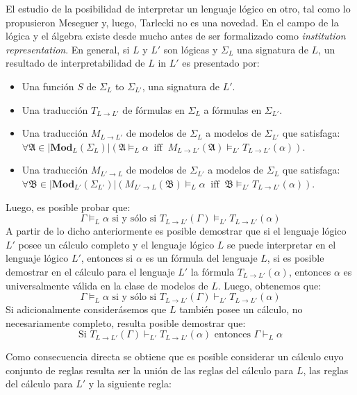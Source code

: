 El estudio de la posibilidad de interpretar un lenguaje lógico en otro, tal como lo propusieron Meseguer y, luego, Tarlecki no es una novedad. En el campo de la lógica y el álgebra existe desde mucho antes de ser formalizado como \emph{institution representation}. En general, si $L$ y $L'$ son lógicas y $\Sigma_L$ una signatura de $L$, un
resultado de interpretabilidad de $L$ in $L'$ es presentado por:
\begin{itemize}
\item Una función $S$ de $\Sigma_L$ to $\Sigma_{L'}$, una signatura de $L'$.
\item Una traducción $T_{L \to L'}$  de fórmulas en $\Sigma_L$ a fórmulas en $\Sigma_{L'}$.
\item Una traducción $M_{L \to L'}$ de modelos de $\Sigma_L$ a modelos de $\Sigma_{L'}$ que satisfaga: $\forall \mathfrak{A} \in |\mathbf{Mod}_L(\Sigma_L)| \left( \mathfrak{A}\models_{L} \alpha\ \mbox{ iff }\ M_{L \to L'}(\mathfrak{A}) \models_{L'} T_{L \to L'}(\alpha) \right)$.
\item Una traducción $M_{L' \to L}$ de modelos de $\Sigma_{L'}$ a modelos de $\Sigma_L$ que satisfaga: $\forall \mathfrak{B} \in |\mathbf{Mod}_{L'}(\Sigma_{L'})| \left(M_{L' \to L}(\mathfrak{B})\models_{L} \alpha\ \mbox{ iff }\ \mathfrak{B}\models_{L'} T_{L \to L'}(\alpha) \right)$.
\end{itemize}
Luego, es posible probar que: 
$$\Gamma \models_L \alpha \mbox{ si y sólo si } T_{L \to L'}(\Gamma) \models_{L'} T_{L \to L'}(\alpha)$$
A partir de lo dicho anteriormente es posible demostrar que si el lenguaje lógico $L'$ posee un cálculo completo y el lenguaje lógico $L$ se puede interpretar en el lenguaje lógico $L'$, entonces si $\alpha$ es un fórmula del lenguaje $L$, si es posible demostrar en el cálculo para el lenguaje $L'$ la fórmula $T_{L \to L'} (\alpha)$, entonces $\alpha$ es universalmente válida en la clase de modelos de $L$. Luego, obtenemos que:
$$\Gamma \models_L \alpha \mbox{ si y sólo si } T_{L \to L'}(\Gamma) \vdash_{L'} T_{L \to L'}(\alpha)$$
Si adicionalmente considerásemos que $L$ también posee un cálculo, no necesariamente completo, resulta posible demostrar que:
$$\mbox{Si } T_{L \to L'}(\Gamma) \vdash_{L'} T_{L \to L'}(\alpha) \mbox{ entonces } \Gamma \vdash_L \alpha$$

Como consecuencia directa se obtiene que es posible considerar un cálculo cuyo conjunto de reglas resulta ser la unión de las reglas del cálculo para $L$, las reglas del cálculo para $L'$ y la siguiente regla:


